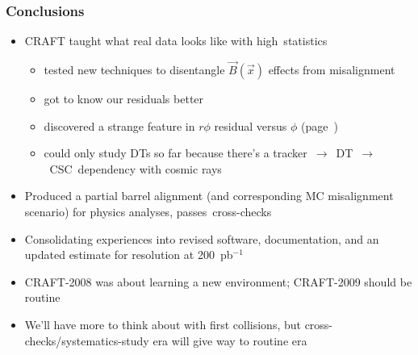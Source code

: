 \documentclass[compress]{beamer}
\begin{document}
\begin{frame}
\frametitle{Conclusions}

\begin{itemize}\setlength{\itemsep}{0.1 cm}
\item CRAFT taught what real data looks like with \mbox{high statistics\hspace{-1 cm}}
\begin{itemize}\setlength{\itemsep}{0.1 cm}
\item tested new techniques to disentangle $\vec{B}(\vec{x})$ effects
  from misalignment
\item got to know our residuals better
\item discovered a strange feature in $r\phi$ residual versus $\phi$ (page~\pageref{page:rphivsphi})
\item could only study DTs so far because there's a \mbox{tracker $\to$ DT $\to$ CSC dependency} with cosmic rays
\end{itemize}

\item Produced a partial barrel alignment (and corresponding MC
  misalignment scenario) for physics analyses, \mbox{passes cross-checks\hspace{-1 cm}}

\item Consolidating experiences into revised software, documentation,
  and an updated estimate for resolution at 200~pb$^{-1}$

\item CRAFT-2008 was about learning a new environment; CRAFT-2009 should be routine

\item We'll have more to think about with first collisions, but
  cross-checks/systematics-study era will give way to routine
  era
\end{itemize}

\label{numpages}
\end{frame}
\end{document}
